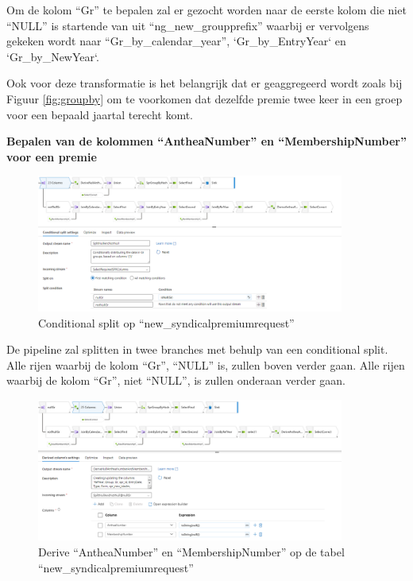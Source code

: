 Om de kolom ``Gr'' te bepalen zal er gezocht worden naar de eerste kolom die niet ``NULL'' is startende van uit ``ng\_new\_groupprefix'' waarbij er vervolgens gekeken wordt naar ``Gr\_by\_calendar\_year'', `Gr\_by\_EntryYear` en `Gr\_by\_NewYear`.

Ook voor deze transformatie is het belangrijk dat er geaggregeerd wordt zoals bij Figuur \ref{fig:groupby} om te voorkomen dat dezelfde premie twee keer in een groep voor een bepaald jaartal terecht komt.

\pagebreak

\textbf{Bepalen van de kolommen ``AntheaNumber'' en ``MembershipNumber'' voor een premie}

\begin{figure}[H]
    \centering
    \includegraphics[width=0.9\textwidth]{./graphics/adf/member_1.png}
    \caption{Conditional split op ``new\_syndicalpremiumrequest''}
\end{figure}

De pipeline zal splitten in twee branches met behulp van een conditional split. Alle rijen waarbij de kolom ``Gr'', ``NULL'' is, zullen boven verder gaan. Alle rijen waarbij de kolom ``Gr'', niet ``NULL'', is zullen onderaan verder gaan.

\begin{figure}[H]
    \centering
    \includegraphics[width=0.9\textwidth]{./graphics/adf/member_2.png}
    \caption{Derive ``AntheaNumber'' en ``MembershipNumber'' op de tabel ``new\_syndicalpremiumrequest''}
\end{figure}


